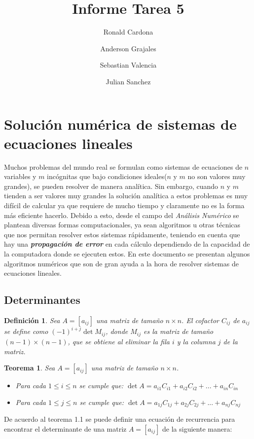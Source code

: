 \documentclass[12pt]{article}
\title{Informe Tarea 5}
\author {Ronald Cardona
\and Anderson Grajales
\and Sebastian Valencia
\and Julian Sanchez}
\newtheorem{definition}{Definición}[section]
\newtheorem{theorem}{Teorema}[section]
\begin{document}
	\maketitle
	\section{Solución numérica de sistemas de ecuaciones lineales}
	Muchos problemas del mundo real se formulan como sistemas de ecuaciones de $n$ variables y $m$ incógnitas que bajo condiciones ideales($n$ y $m$ no son valores muy grandes), se pueden resolver de manera analítica. Sin embargo, cuando $n$ y $m$ tienden a ser valores muy grandes la solución analítica a estos problemas es muy difícil de calcular ya que requiere de mucho tiempo y claramente no es la forma más eficiente hacerlo. Debido a esto, desde el campo del \textit{Análisis Numérico} se plantean diversas formas computacionales, ya sean algoritmos u otras técnicas que nos permitan resolver estos sistemas rápidamente, teniendo en cuenta que hay una \textit{\textbf{propagación de error}} en cada cálculo dependiendo de la capacidad de la computadora donde se ejecuten estos.
	En este documento se presentan algunos algoritmos numéricos que son de gran ayuda a la hora de resolver sistemas de ecuaciones lineales.
	\subsection{Determinantes}
	\begin{definition}
		Sea $A = [a_{ij}]$ una matriz de tamaño $n \times n$. El cofactor $C_{ij}$ de $a_{ij}$ se define como $(-1)^{i+j}\det {M_{ij}}$, donde $M_{ij}$ es la matriz de tamaño $(n - 1) \times (n - 1)$, que se obtiene al eliminar la fila $i$ y la columna $j$ de la matriz.\cite{algebralineal}
	\end{definition}
	\begin{theorem}
		Sea $A=[a_{ij}]$ una matriz de tamaño $n \times n$. \cite{algebralineal}
		\begin{itemize}
			\item Para cada $1\leq i \leq n$ se cumple que:
			$\det {A} = a_{i1}C_{i1} + a_{i2}C_{i2} + ... + a_{in}C_{in}$
			\item Para cada $1\leq j \leq n$ se cumple que:
			$\det {A} = a_{1j}C_{1j} + a_{2j}C_{2j} + ... + a_{nj}C_{nj}$
		\end{itemize}
	\end{theorem}
	De acuerdo al teorema 1.1 se puede definir una ecuación de recurrencia para encontrar el determinante de una matriz $A = [a_{ij}]$ de la siguiente manera:
	
\end{document}
